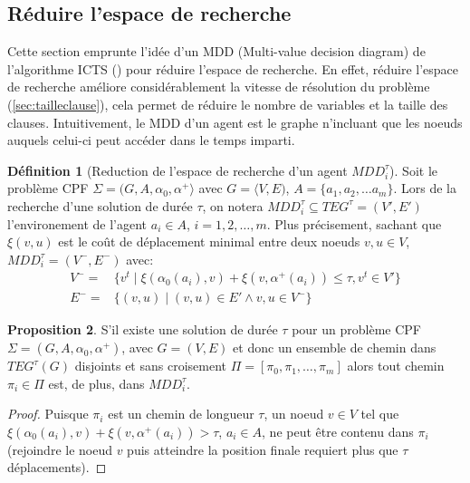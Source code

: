 \documentclass[french, 12pt, letterpaper]{article}
\theoremstyle{definition}
\newtheorem{definition}{Définition}[subsection]
\theoremstyle{proposition}
\newtheorem{proposition}[definition]{Proposition}
\theoremstyle{example}
\begin{document}
    \subsection{Réduire l'espace de recherche}
    \label{sec:mdd}

    Cette section emprunte l'idée d'un MDD (Multi-value decision diagram) de l'algorithme ICTS (\cite{ICTS}) pour réduire l'espace de recherche.
    En effet, réduire l'espace de recherche améliore considérablement la vitesse de résolution du problème (\ref{sec:tailleclause}), 
    cela permet de réduire le nombre de variables et la taille des clauses.
    Intuitivement, le MDD d'un agent est le graphe n'incluant que les noeuds auquels celui-ci peut accéder dans le temps imparti.

    \begin{definition}[Reduction de l'espace de recherche d'un agent $MDD_i^\tau$]
        Soit le problème CPF $\Sigma = ( G, A, \alpha_0, \alpha^+ \rangle$ avec $G = \langle V, E )$, $A = \{a_1, a_2, \ldots a_m\}$.
        Lors de la recherche d'une solution de durée $\tau$, on notera $MDD_i^\tau \subseteq TEG^\tau = ( V', E' )$ l'environement de l'agent 
        $a_i \in A$, $i = 1, 2, \dots, m$. Plus précisement, sachant que $\xi(v, u)$ est le coût de déplacement minimal entre deux noeuds $v, u \in V$, 
        $MDD_i^\tau = ( V^-, E^- )$ avec:
        \begin{align*}
            V^- =& \{v^t\;|\; \xi(\alpha_0(a_i), v) + \xi(v, \alpha^+(a_i)) \leq \tau, v^t \in V'\}\\
            E^- =& \{( v, u ) \;|\; ( v, u ) \in E' \land v, u \in V^-\}
        \end{align*} 
    \end{definition}

    \begin{proposition}
        S'il existe une solution de durée $\tau$ pour un problème CPF $\Sigma = ( G, A, \alpha_0, \alpha^+ )$,
        avec $G = ( V, E )$
        et donc un ensemble de chemin dans $TEG^\tau(G)$ disjoints et sans croisement $\Pi = [\pi_0, \pi_1, \ldots, \pi_m]$ alors tout chemin
        $\pi_i \in \Pi$ est, de plus, dans $MDD^\tau_i$.
    \end{proposition}

    \begin{proof}
        Puisque $\pi_i$ est un chemin de longueur $\tau$, un noeud $v \in V$ tel que $\xi(\alpha_0(a_i), v) + \xi(v, \alpha^+(a_i)) > \tau$, $a_i \in A$,
        ne peut être contenu dans $\pi_i$ (rejoindre le noeud $v$ puis atteindre la position finale requiert plus que $\tau$ déplacements).
    \end{proof}
\end{document}
